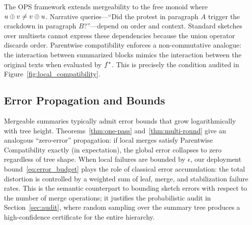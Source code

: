 The OPS framework extends mergeability to the free monoid where $u\oplus v\neq v\oplus u$. Narrative queries---``Did the protest in paragraph $A$ trigger the crackdown in paragraph $B$?''---depend on order and context. Standard sketches over multisets cannot express these dependencies because the union operator discards order. Parentwise compatibility enforces a non-commutative analogue: the interaction between summarized blocks mimics the interaction between the original texts when evaluated by $f^{\ast}$. This is precisely the condition audited in Figure~\ref{fig:local_compatibility}.

\subsection{Error Propagation and Bounds}

Mergeable summaries typically admit error bounds that grow logarithmically with tree height. Theorems~\ref{thm:one-pass} and~\ref{thm:multi-round} give an analogous ``zero-error'' propagation: if local merges satisfy Parentwise Compatibility exactly (in expectation), the global error collapses to zero regardless of tree shape. When local failures are bounded by $\epsilon$, our deployment bound~\eqref{eq:error_budget} plays the role of classical error accumulation: the total distortion is controlled by a weighted sum of leaf, merge, and stabilization failure rates. This is the semantic counterpart to bounding sketch errors with respect to the number of merge operations; it justifies the probabilistic audit in Section~\ref{sec:audit}, where random sampling over the summary tree produces a high-confidence certificate for the entire hierarchy.
